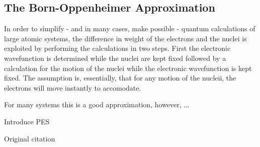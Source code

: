 \subsection{The Born-Oppenheimer Approximation}
\label{sec:born-oppenheimer}

In order to simplify - and in many cases, make possible - quantum calculations of large atomic systems, the difference in weight of the electrons and the nuclei is exploited by performing the calculations in two steps.
First the electronic wavefunction is determined while the nuclei are kept fixed followed by a calculation for the motion of the nuclei while the electronic wavefunction is kept fixed.
The assumption is, essentially, that for any motion of the nucleii, the electrons will move instantly to accomodate.

For many systems this is a good approximation, however, ...

\bit
\item Introduce PES
\item Original citation~\cite{born-oppenheimer-1927}
\eit

\incomplete
